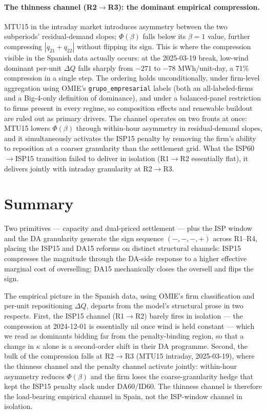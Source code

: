 \documentclass[11pt,a4paper]{article}
\begin{document}
\paragraph{The thinness channel (R2$\to$R3): the dominant empirical
compression.} MTU15 in the intraday market introduces asymmetry between
the two subperiods' residual-demand slopes; $\Phi(\beta)$ falls below
its $\beta=1$ value, further compressing $|q_{21}+q_{22}|$ without
flipping its sign. This is where the compression visible in the Spanish
data actually occurs: at the 2025-03-19 break, low-wind dominant
per-unit $\Delta Q$ falls sharply from $-271$ to $-78$ MWh/unit-day, a
71\% compression in a single step. The ordering holds unconditionally,
under firm-level aggregation using OMIE's \texttt{grupo\_empresarial}
labels (both an all-labeled-firms and a Big-4-only definition of
dominance), and under a balanced-panel restriction to firms present in
every regime, so composition effects and renewable buildout are ruled
out as primary drivers. The channel operates on two fronts at once:
MTU15 lowers $\Phi(\beta)$ through within-hour asymmetry in
residual-demand slopes, and it simultaneously activates the ISP15
penalty by removing the firm's ability to reposition at a coarser
granularity than the settlement grid. What the ISP60$\to$ISP15
transition failed to deliver in isolation (R1$\to$R2 essentially flat),
it delivers jointly with intraday granularity at R2$\to$R3.

\section{Summary}

Two primitives --- capacity and dual-priced settlement --- plus the ISP
window and the DA granularity generate the sign sequence $(-,-,-,+)$
across R1--R4, placing the ISP15 and DA15 reforms on distinct structural
channels: ISP15 compresses the magnitude through the DA-side response
to a higher effective marginal cost of overselling; DA15 mechanically
closes the oversell and flips the sign.

The empirical picture in the Spanish data, using OMIE's firm
classification and per-unit repositioning $\Delta Q$, departs from the
model's structural prose in two respects. First, the ISP15 channel
(R1$\to$R2) barely fires in isolation --- the compression at 2024-12-01
is essentially nil once wind is held constant --- which we read as
dominants bidding far from the penalty-binding region, so that a change
in $\kappa$ alone is a second-order shift in their DA programme.
Second, the bulk of the compression falls at R2$\to$R3 (MTU15 intraday,
2025-03-19), where the thinness channel and the penalty channel
activate jointly: within-hour asymmetry reduces $\Phi(\beta)$ and the
firm loses the coarse-granularity hedge that kept the ISP15 penalty
slack under DA60/ID60. The thinness channel is therefore the
load-bearing empirical channel in Spain, not the ISP-window channel in
isolation.
\end{document}
